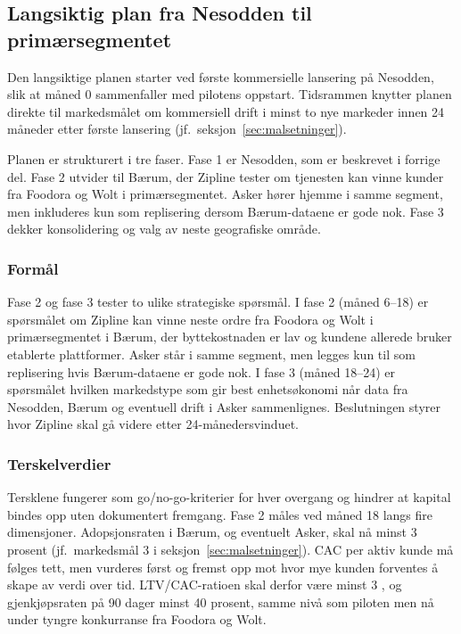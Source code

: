 \subsection{Langsiktig plan fra Nesodden til primærsegmentet}

Den langsiktige planen starter ved første kommersielle lansering på
Nesodden, slik at måned 0 sammenfaller med pilotens oppstart. Tidsrammen
knytter planen direkte til markedsmålet om kommersiell drift i minst to
nye markeder innen 24 måneder etter første lansering
(jf.\ seksjon~\ref{sec:malsetninger}).

Planen er strukturert i tre faser. Fase 1 er Nesodden, som er beskrevet
i forrige del. Fase 2 utvider til Bærum, der Zipline tester om tjenesten
kan vinne kunder fra Foodora og Wolt i primærsegmentet. Asker hører
hjemme i samme segment, men inkluderes kun som replisering dersom
Bærum-dataene er gode nok. Fase 3 dekker konsolidering og valg av neste
geografiske område.

\subsubsection{Formål}

Fase 2 og fase 3 tester to ulike strategiske spørsmål. I fase 2 (måned
6--18) er spørsmålet om Zipline kan vinne neste ordre fra Foodora og
Wolt i primærsegmentet i Bærum, der byttekostnaden er lav og kundene
allerede bruker etablerte plattformer. Asker står i samme segment, men
legges kun til som replisering hvis Bærum-dataene er gode nok. I fase 3
(måned 18--24) er spørsmålet hvilken markedstype som gir best
enhetsøkonomi når data fra Nesodden, Bærum og eventuell drift i Asker
sammenlignes. Beslutningen styrer hvor Zipline skal gå videre etter
24-månedersvinduet.

\subsubsection{Terskelverdier}

Tersklene fungerer som go/no-go-kriterier for hver overgang og hindrer
at kapital bindes opp uten dokumentert fremgang. Fase 2 måles ved
måned 18 langs fire dimensjoner. Adopsjons\-raten i Bærum, og
eventuelt Asker, skal nå minst 3 prosent (jf.\ markedsmål 3 i
seksjon~\ref{sec:malsetninger}). CAC per aktiv kunde må følges tett,
men vurderes først og fremst opp mot hvor mye kunden forventes å skape
av verdi over tid. LTV/CAC-ratioen skal derfor være minst 3
\parencite{understory_ltvcac}, og gjenkjøps\-raten på 90 dager minst
40 prosent, samme nivå som piloten men nå under tyngre konkurranse
fra Foodora og Wolt.

